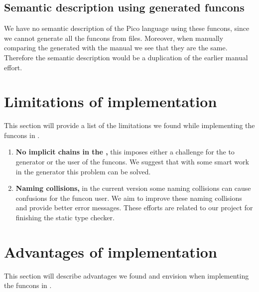 \documentclass[a4paper, oneside, notitlepage]{article}
\newcommand{\CSF}{\textsmaller{CSF}\xspace}
\newcommand{\ADT}{\textsmaller{ADT}\xspace}
\newcommand{\ADTs}{\textsmaller{ADTs}\xspace}
\begin{document}
	\subsection{Semantic description using generated funcons}
	We have no semantic description of the Pico language using these funcons,
	since we cannot generate all the funcons from \CSF files.
	Moreover, when manually comparing the generated \ADT with the manual \ADT we
	see that they are the same.
	Therefore the semantic description would be a duplication of the earlier
	manual effort.

\section{Limitations of \Rascal implementation}
This section will provide a list of the limitations we found while implementing
the funcons in \Rascal.

\begin{enumerate}
	\newcommand{\limit}[2]{\item \textbf{#1,} #2}
	\limit
		{No implicit chains in the \ADTs}
		{
			this imposes either a challenge for the \CSF to \Rascal generator or
			the user of the funcons.
			We suggest that with some smart work in the \Rascal generator this
			problem can be solved.
		}

	\limit
		{Naming collisions}
		{
			in the current version some naming collisions can cause confusions
			for the funcon user.
			We aim to improve these naming collisions and provide better error
			messages.
			These efforts are related to our project for finishing the static type
			checker.
		}
	
\end{enumerate}

\section{Advantages of \Rascal implementation}

This section will describe advantages we found and envision when implementing
the funcons in \Rascal.
\end{document}
